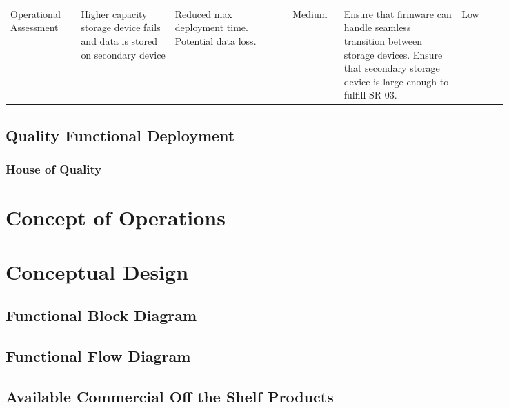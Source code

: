 \begin{landscape}
{\begin{longtable}{| p{0.12\linewidth} | p{0.16\linewidth} |  p{0.20\linewidth} | p{0.08\linewidth} | p{0.20\linewidth} | p{0.08\linewidth} |}
	\hline
	Operational \newline Assessment & Higher capacity storage device fails and data is stored on secondary device & Reduced max deployment time. \newline Potential data loss. & \cellcolor{yellow} Medium & Ensure that firmware can handle seamless transition between storage devices. \newline Ensure that secondary storage device is large enough to fulfill SR 03. & \cellcolor{green} Low
	\label{tab:sr11_feasibility}
\end{longtable}
}
\newpage

\end{landscape}

\subsection{Quality Functional Deployment} \label{ssec:qfd}

\subsubsection{House of Quality} \label{sssec:hoq}
\begin{landscape}
	
\end{landscape}

\section{Concept of Operations} \label{sec:conops}

\section{Conceptual Design} \label{sec:conceptual_design}

\subsection{Functional Block Diagram} \label{ssec:block_diagram}

\subsection{Functional Flow Diagram} \label{ssec:flow_diagram}

\subsection{Available Commercial Off the Shelf Products} \label{ssec:cots_products}

